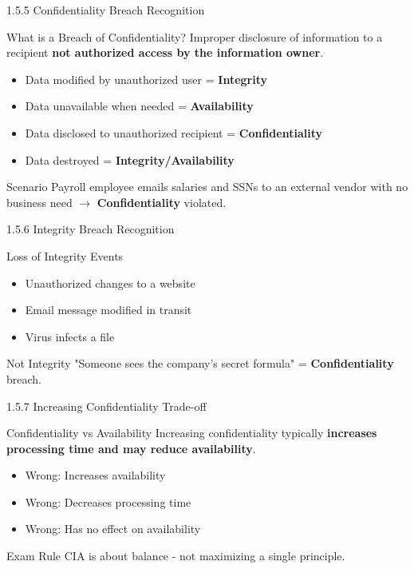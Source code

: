 \documentclass{beamer}
\begin{document}
	\begin{frame}{1.5.5 Confidentiality Breach Recognition}
		\begin{block}{What is a Breach of Confidentiality?}
			Improper disclosure of information to a recipient \textbf{not authorized access by the information owner}.
		\end{block}
		\begin{itemize}
			\item Data modified by unauthorized user = \textbf{Integrity}
			\item Data unavailable when needed = \textbf{Availability}
			\item Data disclosed to unauthorized recipient = \textbf{Confidentiality}
			\item Data destroyed = \textbf{Integrity/Availability}
		\end{itemize}
		\begin{exampleblock}{Scenario}
			Payroll employee emails salaries and SSNs to an external vendor with no business need $\rightarrow$ \textbf{Confidentiality} violated.
		\end{exampleblock}
	\end{frame}
	
	\begin{frame}{1.5.6 Integrity Breach Recognition}
		\begin{block}{Loss of Integrity Events}
			\begin{itemize}
				\item Unauthorized changes to a website
				\item Email message modified in transit
				\item Virus infects a file
			\end{itemize}
		\end{block}
		\begin{alertblock}{Not Integrity}
			"Someone sees the company's secret formula" = \textbf{Confidentiality} breach.
		\end{alertblock}
	\end{frame}
	
	\begin{frame}{1.5.7 Increasing Confidentiality Trade-off}
		\begin{block}{Confidentiality vs Availability}
			Increasing confidentiality typically \textbf{increases processing time and may reduce availability}.
		\end{block}
		\begin{itemize}
			\item Wrong: Increases availability
			\item Wrong: Decreases processing time
			\item Wrong: Has no effect on availability
		\end{itemize}
		\begin{exampleblock}{Exam Rule}
			CIA is about balance - not maximizing a single principle.
		\end{exampleblock}
	\end{frame}
	
\end{document}
